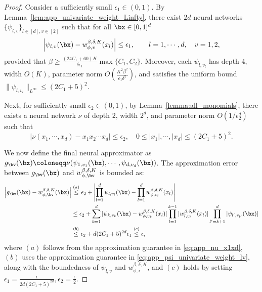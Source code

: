 \documentclass[11pt]{article}
\begin{document}
\begin{proof}
    Consider a sufficiently small $\epsilon_1 \in (0,1)$.
    By Lemma~\ref{lem:app_univariate_weight_Linfty}, there exist $2d$ neural networks $\{\psi_{l,v}\}_{l \in [d], v\in[2]}$ such that  for all $\bx \in [0,1]^d$
    \begin{equation}
        \left| \psi_{l,v} (\bx)-  w_{\phi, v}^{\beta, \delta, K}(x_l) \right| \leq  \epsilon_1, \quad \quad l =1, \cdots, d, \quad v = 1, 2,
        \label{eq:app_psi_univariate_weight_lv}
    \end{equation}
    provided that $\beta \geq \frac{(24C_1 + 60) K}{\delta \epsilon_1} \max \{C_1, C_2\}$. Moreover, each $\psi_{l,v_l}$ has depth $4$, width $O(K)$, parameter norm $O(\frac{K^2 \beta^2}{\epsilon_1 \delta^2})$, and satisfies the uniform bound $\|\psi_{l,v_l}\|_{L^{\infty}} \leq (2C_1+5)^2$.


    Next, for sufficiently small $\epsilon_2 \in (0,1) $, by Lemma~\ref{lemma:all_monomials}, there exists a neural network $ \nu $ of depth 2, width $ 2^d $, and parameter norm $O(1 / \epsilon_2^d)$ such that
    \begin{equation}
       |\nu(x_1, \cdots ,x_d) - x_1 x_2 \cdots x_d| \leq \epsilon_2, \quad 0\leq |x_1|, \cdots,  |x_d| \leq (2C_1+5)^2.
       \label{eq:app_nu_x1xd}
    \end{equation}

    
    We now define the final neural approximator as $g_{\bv}(\bx) \coloneqq  \nu(\psi_{1,v_1}(\bx), \cdots, \psi_{d, v_d}(\bx))$. The approximation error between $ g_{\bv}(\bx)$ and $w_{\phi, \bv}^{\beta, \delta, K}$ is bounded as:
    \begin{equation}
        \begin{aligned}
            \left|  g_{\bv}(\bx) - w_{\phi, \bv}^{\beta, \delta, K}(\bx)\right| & \overset{(a)}{\leq} \epsilon_2 + \left| \prod_{l=1}^d\psi_{l,v_l}(\bx) - \prod_{l=1}^d w_{\phi, v_l}^{\beta, \delta, K}(x_l)\right| \\
            & \leq \epsilon_2 + \sum_{k=1}^{d} |\psi_{k,v_k}(\bx) - w_{\phi, v_k}^{\beta, \delta, K}(x_l)| \prod_{l=1}^{k-1} |w_{l, v_{l}}^{\beta, \delta,K}(x_l)| \prod_{l^{\prime}=k+1}^d |\psi_{l^{\prime},v_{l^{\prime}}}(\bx) | \\
            & \overset{(b)}{\leq}\epsilon_2 + d (2C_1+5)^{2d} \epsilon_1 \overset{(c)}{\leq} \epsilon,
        \end{aligned}
        \label{eq:app_varphiv_multi_weight}
    \end{equation}
    where $(a)$ follows from the approximation guarantee in \eqref{eq:app_nu_x1xd}, $(b)$ uses the approximation guarantee in \eqref{eq:app_psi_univariate_weight_lv}, along with the boundedness of $\psi_{l,v}$ and $w_{\phi, i}^{\beta, \delta, K}$, and $(c)$  holds by setting $\epsilon_1 = \frac{\epsilon}{2d(2C_1+5)^{2d}}, \epsilon_2 = \frac{\epsilon}{2} $. 
    

\end{proof}
\end{document}
